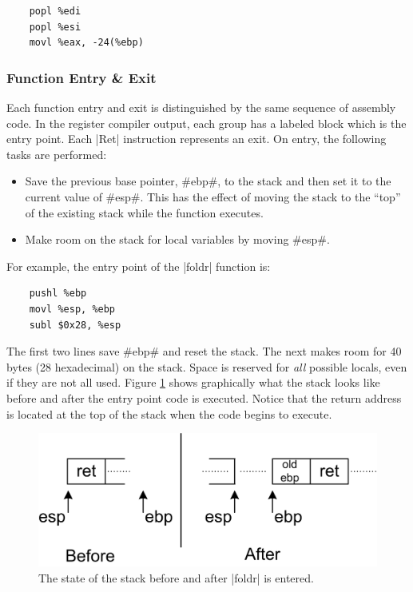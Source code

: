 \documentclass[11pt]{article}
\begin{document}
\begin{verbatim}
    popl %edi
    popl %esi
    movl %eax, -24(%ebp)
\end{verbatim}

\subsubsection{Function Entry \& Exit}
Each function entry and exit is distinguished by the same sequence of
assembly code. In the register compiler output, each group has a
labeled block which is the entry point. Each |Ret| instruction
represents an exit. On entry, the following tasks are performed:

\begin{itemize}
\item Save the previous base pointer, #ebp#, to the stack and then set
  it to the current value of #esp#. This has the effect of moving the
  stack to the ``top'' of the existing stack while the function executes.
\item Make room on the stack for local variables by moving #esp#. 
\end{itemize}

For example, the entry point of the |foldr| function is:

\begin{verbatim}
    pushl %ebp
    movl %esp, %ebp
    subl $0x28, %esp
\end{verbatim}

The first two lines save #ebp# and reset the stack. The next makes
room for 40 bytes (28 hexadecimal) on the stack. Space is reserved for
\emph{all} possible locals, even if they are not all used. Figure
\ref{fig_entry} shows graphically what the stack looks like before and
after the entry point code is executed. Notice that the return address
is located at the top of the stack when the code begins to execute.

\begin{figure}\centering
\includegraphics{fig_entry}
\caption{The state of the stack before and after 
|foldr| is entered.}
\label{fig_entry}
\end{figure}
\end{document}

